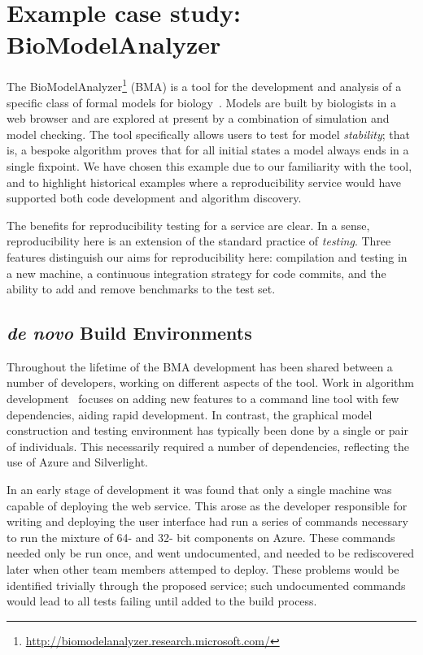 \documentclass{llncs}
\begin{document}
\section{Example case study: BioModelAnalyzer}\label{example}


The
BioModelAnalyzer\footnote{\url{http://biomodelanalyzer.research.microsoft.com/}}
(BMA) is a tool for the development and analysis of a specific class of
formal models for
biology~\cite{benque2012,cook-et-al:2010,cook2014}. Models are built
by biologists in a web browser and are explored at present by a
combination of simulation and model checking. The tool specifically
allows users to test for model \emph{stability}; that is, a bespoke
algorithm proves that for all initial states a model always ends in a
single fixpoint. We have chosen this example due to our familiarity
with the tool, and to highlight historical examples where a
reproducibility service would have supported both code development and
algorithm discovery.

The benefits for reproducibility testing for a service are clear. In a sense,
reproducibility here is an extension of the standard practice of \emph{testing}.
Three features distinguish our aims for reproducibility here: compilation and testing
in a new machine, a continuous integration strategy for code commits, and 
the ability to add and remove benchmarks to the test set.

\subsection{\emph{de novo} Build Environments}

Throughout the lifetime of the BMA development has been shared between a 
number of developers, working on different aspects of the tool. Work in 
algorithm development~\cite{cook2014,piterman2013} focuses on adding 
new features to a command line tool with few dependencies, aiding rapid 
development. In contrast, the graphical model construction and testing 
environment has typically been done by a single or pair of individuals. 
This necessarily required a number of dependencies, reflecting the use
of Azure and Silverlight.

In an early stage of development it was found that only a single machine 
was capable of deploying the web service. This arose as the developer 
responsible for writing and deploying the user interface had run a series
of commands necessary to run the mixture of 64- and 32- bit components on
Azure. These commands needed only be run once, and went undocumented, and 
needed to be rediscovered later when other team members attemped to deploy.
These problems would be identified trivially through the proposed service;
such undocumented commands would lead to all tests failing until added to 
the build process.
\end{document}
